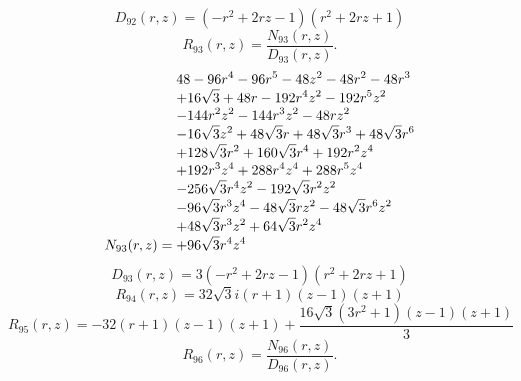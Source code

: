 \documentclass[11pt,a4paper]{article}
\begin{document}
\begin{equation}
D_{92}(r,z)=\left(- r^{2} + 2 r z - 1\right) \left(r^{2} + 2 r z + 1\right)
\label{eq:cat-denominator-92}
\end{equation}
\begin{equation}
R_{93}(r,z)=\frac{N_{93}(r,z)}{D_{93}(r,z)}.
\label{eq:cat-rational-93}
\end{equation}
\begin{equation}
N_{93}(r,z)=\shortstack[l]{$\displaystyle 48 - 96 r^{4} - 96 r^{5} - 48 z^{2} - 48 r^{2} - 48 r^{3}$\\
$\displaystyle  + 16 \sqrt{3} + 48 r - 192 r^{4} z^{2} - 192 r^{5} z^{2}$\\
$\displaystyle  - 144 r^{2} z^{2} - 144 r^{3} z^{2} - 48 r z^{2}$\\
$\displaystyle  - 16 \sqrt{3} z^{2} + 48 \sqrt{3} r + 48 \sqrt{3} r^{3} + 48 \sqrt{3} r^{6}$\\
$\displaystyle  + 128 \sqrt{3} r^{2} + 160 \sqrt{3} r^{4} + 192 r^{2} z^{4}$\\
$\displaystyle  + 192 r^{3} z^{4} + 288 r^{4} z^{4} + 288 r^{5} z^{4}$\\
$\displaystyle  - 256 \sqrt{3} r^{4} z^{2} - 192 \sqrt{3} r^{2} z^{2}$\\
$\displaystyle  - 96 \sqrt{3} r^{3} z^{4} - 48 \sqrt{3} r z^{2} - 48 \sqrt{3} r^{6} z^{2}$\\
$\displaystyle  + 48 \sqrt{3} r^{3} z^{2} + 64 \sqrt{3} r^{2} z^{4}$\\
$\displaystyle  + 96 \sqrt{3} r^{4} z^{4}$}
\label{eq:cat-numerator-93}
\end{equation}
\begin{equation}
D_{93}(r,z)=3 \left(- r^{2} + 2 r z - 1\right) \left(r^{2} + 2 r z + 1\right)
\label{eq:cat-denominator-93}
\end{equation}
\begin{equation}
R_{94}(r,z)=32 \sqrt{3} i \left(r + 1\right) \left(z - 1\right) \left(z + 1\right)
\label{eq:cat-rational-94}
\end{equation}
\begin{equation}
R_{95}(r,z)=- 32 \left(r + 1\right) \left(z - 1\right) \left(z + 1\right) + \frac{16 \sqrt{3} \left(3 r^{2} + 1\right) \left(z - 1\right) \left(z + 1\right)}{3}
\label{eq:cat-rational-95}
\end{equation}
\begin{equation}
R_{96}(r,z)=\frac{N_{96}(r,z)}{D_{96}(r,z)}.
\label{eq:cat-rational-96}
\end{equation}
\end{document}
